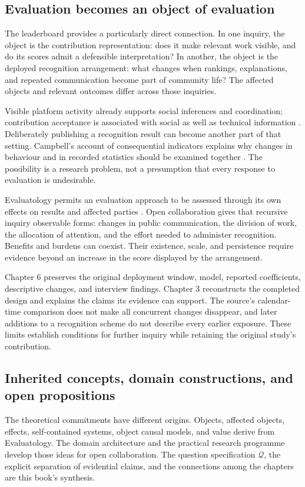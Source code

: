 \subsection{Evaluation becomes an object of evaluation}
The leaderboard provides a particularly direct connection. In one inquiry, the object is the contribution representation: does it make relevant work visible, and do its scores admit a defensible interpretation? In another, the object is the deployed recognition arrangement: what changes when rankings, explanations, and repeated communication become part of community life? The affected objects and relevant outcomes differ across those inquiries.

Visible platform activity already supports social inferences and coordination; contribution acceptance is associated with social as well as technical information \citep{dabbish2012,tsay2014}. Deliberately publishing a recognition result can become another part of that setting. Campbell's account of consequential indicators explains why changes in behaviour and in recorded statistics should be examined together \citep{campbell2011}. The possibility is a research problem, not a presumption that every response to evaluation is undesirable.

Evaluatology permits an evaluation approach to be assessed through its own effects on results and affected parties \citep[Section 8.7.4]{zhan2026book}. Open collaboration gives that recursive inquiry observable forms: changes in public communication, the division of work, the allocation of attention, and the effort needed to administer recognition. Benefits and burdens can coexist. Their existence, scale, and persistence require evidence beyond an increase in the score displayed by the arrangement.

Chapter 6 preserves the original deployment window, model, reported coefficients, descriptive changes, and interview findings. Chapter 3 reconstructs the completed design and explains the claims its evidence can support. The source's calendar-time comparison does not make all concurrent changes disappear, and later additions to a recognition scheme do not describe every earlier exposure. These limits establish conditions for further inquiry while retaining the original study's contribution.

\subsection{Inherited concepts, domain constructions, and open propositions}
The theoretical commitments have different origins. Objects, affected objects, effects, self-contained systems, object causal models, and value derive from Evaluatology. The domain architecture and the practical research programme develop those ideas for open collaboration. The question specification \(\mathcal Q\), the explicit separation of evidential claims, and the connections among the chapters are this book's synthesis.

